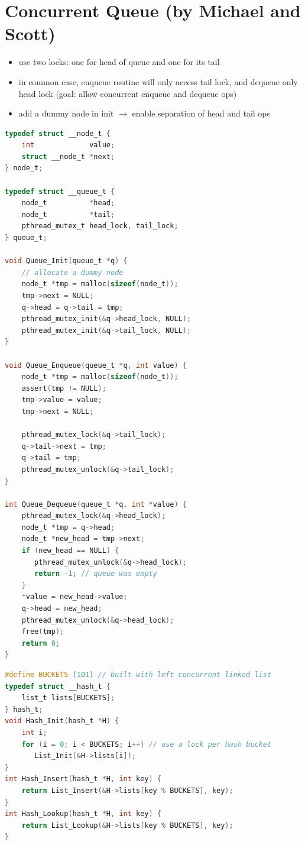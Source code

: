 \section*{Concurrent Queue (by Michael and Scott)}
\begin{itemize}
\item use two locks: one for head of queue and one for its tail
\item in common case, enqueue routine will only access tail lock, and dequeue only head lock (goal: allow concurrent enqueue and dequeue ops)
\item add a dummy node in init $\to$ enable separation of head and tail ops
\end{itemize}
\begin{lstlisting}[language=c,xleftmargin=16pt,xrightmargin=6pt,framextopmargin=3pt]
typedef struct __node_t {
    int             value;
    struct __node_t *next;
} node_t;

typedef struct __queue_t {
    node_t          *head;
    node_t          *tail;
    pthread_mutex_t head_lock, tail_lock;
} queue_t;

void Queue_Init(queue_t *q) {
    // allocate a dummy node
    node_t *tmp = malloc(sizeof(node_t));
    tmp->next = NULL;
    q->head = q->tail = tmp;
    pthread_mutex_init(&q->head_lock, NULL);
    pthread_mutex_init(&q->tail_lock, NULL);
}

void Queue_Enqueue(queue_t *q, int value) {
    node_t *tmp = malloc(sizeof(node_t));
    assert(tmp != NULL);
    tmp->value = value;
    tmp->next = NULL;

    pthread_mutex_lock(&q->tail_lock);
    q->tail->next = tmp;
    q->tail = tmp;
    pthread_mutex_unlock(&q->tail_lock);
}

int Queue_Dequeue(queue_t *q, int *value) {
    pthread_mutex_lock(&q->head_lock);
    node_t *tmp = q->head;
    node_t *new_head = tmp->next;
    if (new_head == NULL) {
       pthread_mutex_unlock(&q->head_lock);
       return -1; // queue was empty
    }
    *value = new_head->value;
    q->head = new_head;
    pthread_mutex_unlock(&q->head_lock);
    free(tmp);
    return 0;
}
\end{lstlisting}
\begin{lstlisting}[language=c,xleftmargin=16pt,xrightmargin=6pt]
#define BUCKETS (101) // built with left concurrent linked list
typedef struct __hash_t {
    list_t lists[BUCKETS];
} hash_t;
void Hash_Init(hash_t *H) {
    int i;
    for (i = 0; i < BUCKETS; i++) // use a lock per hash bucket
       List_Init(&H->lists[i]);
}
int Hash_Insert(hash_t *H, int key) {
    return List_Insert(&H->lists[key % BUCKETS], key);
}
int Hash_Lookup(hash_t *H, int key) {
    return List_Lookup(&H->lists[key % BUCKETS], key);
}
\end{lstlisting}
